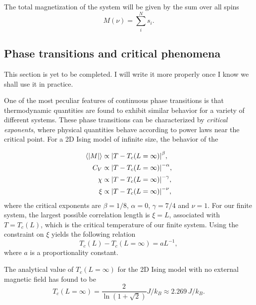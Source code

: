 The total magnetization of the system will be given by the sum over all spins 
\begin{equation}\label{eq:total_magnetization}
    M(\nu) = \sum_{i}^N s_i.
\end{equation}

\subsection{Phase transitions and critical phenomena}\label{subsec_theory:PT_critical_phenomena}
\alert{This section is yet to be completed. I will write it more properly once I know we shall use it in practice.}

One of the most peculiar features of continuous phase transitions is that thermodynamic quantities are found to exhibit similar behavior for a variety of different systems. These phase transitions can be characterized by \textit{critical exponents}, where physical quantities behave according to power laws near the critical point.  For a 2D Ising model of infinite size, the behavior of the 

\begin{align}
    \expval{\abs{M}} & \propto \abs{T - T_c(L=\infty)}^\beta, \label{eq:crit_expo_mag} \\
    C_V & \propto \abs{T - T_c(L=\infty)}^{-\alpha}, \label{eq:crit_expo_heatcap} \\ 
    \chi & \propto \abs{T - T_c(L=\infty)}^{-\gamma}, \label{eq:crit_expo_mag_susc} \\ 
    \xi & \propto \abs{T - T_c(L=\infty)}^{-\nu}, \label{eq:crit_expo_corr_length}
\end{align}
where the critical exponents are $\beta=1/8$, $\alpha=0$, $\gamma=7/4$ and $\nu=1$. For our finite system, the largest possible correlation length is $\xi=L$, associated with $T=T_c(L)$, which is the critical temperature of our finite system. Using the constraint on $\xi$ yields the following relation 
\begin{equation}
    T_c(L) - T_c(L=\infty) = aL^{-1}, \label{eq:finite_size_scaling_relation}
\end{equation}  
where $a$ is a proportionality constant. 

The analytical value of $T_c(L=\infty)$ for the 2D Ising model with no external magnetic field has found to be \cite{Onsager_Ising2D}
\begin{equation}
    T_c(L=\infty) = \frac{2}{\ln(1+\sqrt{2})} J/k_B \approx 2.269\,J/k_B. \label{eq:onsager_critical_temperature}
\end{equation}


